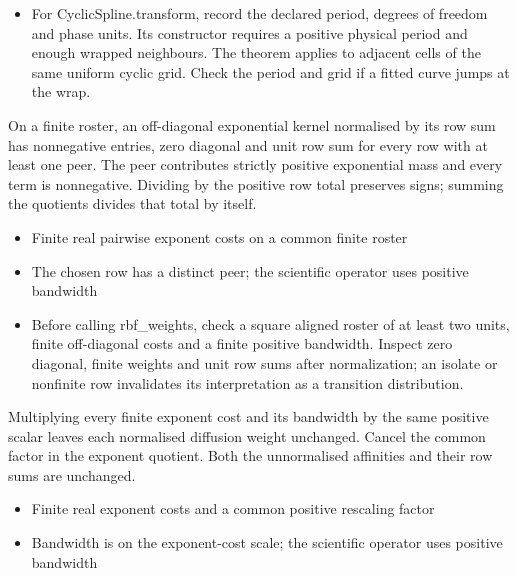 \expandafter\def\csname statadic@diagnostics@STATADIC-SPLINE-001\endcsname{\begin{itemize}
\item For CyclicSpline.transform, record the declared period, degrees of freedom and phase units. Its constructor requires a positive physical period and enough wrapped neighbours. The theorem applies to adjacent cells of the same uniform cyclic grid. Check the period and grid if a fitted curve jumps at the wrap.
\end{itemize}}
\expandafter\def\csname statadic@statement@STATADIC-DIFFUSION-001\endcsname{On a finite roster, an off-diagonal exponential kernel normalised
  by its row sum has nonnegative entries, zero diagonal and unit row sum for every
  row with at least one peer.}
\expandafter\def\csname statadic@proof@STATADIC-DIFFUSION-001\endcsname{The peer contributes strictly positive exponential mass and every
  term is nonnegative. Dividing by the positive row total preserves signs; summing
  the quotients divides that total by itself.}
\expandafter\def\csname statadic@assumptions@STATADIC-DIFFUSION-001\endcsname{\begin{itemize}
\item Finite real pairwise exponent costs on a common finite roster
\item The chosen row has a distinct peer; the scientific operator uses positive bandwidth
\end{itemize}}
\expandafter\def\csname statadic@diagnostics@STATADIC-DIFFUSION-001\endcsname{\begin{itemize}
\item Before calling rbf\_weights, check a square aligned roster of at least two units, finite off-diagonal costs and a finite positive bandwidth. Inspect zero diagonal, finite weights and unit row sums after normalization; an isolate or nonfinite row invalidates its interpretation as a transition distribution.
\end{itemize}}
\expandafter\def\csname statadic@statement@STATADIC-DIFFUSION-002\endcsname{Multiplying every finite exponent cost and its bandwidth by
  the same positive scalar leaves each normalised diffusion weight unchanged.}
\expandafter\def\csname statadic@proof@STATADIC-DIFFUSION-002\endcsname{Cancel the common factor in the exponent quotient. Both the
  unnormalised affinities and their row sums are unchanged.}
\expandafter\def\csname statadic@assumptions@STATADIC-DIFFUSION-002\endcsname{\begin{itemize}
\item Finite real exponent costs and a common positive rescaling factor
\item Bandwidth is on the exponent-cost scale; the scientific operator uses positive bandwidth
\end{itemize}}
